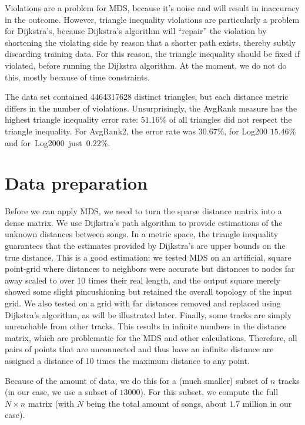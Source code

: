 \documentclass[10pt,fleqn,a4paper]{article}
\begin{document}
\begin{twocolumn}
Violations are a problem for MDS, because it's noise and will result in inaccuracy in the outcome. However, triangle inequality violations are particularly a problem for Dijkstra's, because Dijkstra's algorithm will ``repair'' the violation by shortening the violating side by reason that a shorter path exists, thereby subtly discarding training data. For this reason, the triangle inequality should be fixed if violated, before running the Dijkstra algorithm. At the moment, we do not do this, mostly because of time constraints.

The data set contained 4464317628 distinct triangles, but each distance metric differs in the number of violations.  Unsurprisingly, the AvgRank measure has the highest triangle inequality error rate: $51.16\%$ of all triangles did not respect the triangle inequality.  For AvgRank2, the error rate was $30.67\%$, for Log200 $15.46\%$ and for~Log2000~just~$0.22\%$.

\section{Data preparation}
Before we can apply MDS, we need to turn the sparse distance matrix into a dense matrix. We use Dijkstra's path algorithm to provide estimations of the unknown distances between songs.  In a metric space, the triangle inequality guarantees that the estimates provided by Dijkstra's are upper bounds on the true distance.  This is a good estimation: we tested MDS on an artificial, square point-grid where distances to neighbors were accurate but distances to nodes far away scaled to over 10 times their real length, and the output square merely showed some slight pincushioning but retained the overall topology of the input grid.  We also tested on a grid with far distances removed and replaced using Dijkstra's algorithm, as will be illustrated later.  Finally, some tracks are simply unreachable from other tracks.  This results in infinite numbers in the distance matrix, which are problematic for the MDS and other calculations.  Therefore, all pairs of points that are unconnected and thus have an infinite distance are assigned a distance of 10 times the maximum distance to any point.

Because of the amount of data, we do this for a (much smaller) subset of $n$ tracks (in our case, we use a subset of $13000$). For this subset, we compute the full $N \times n$ matrix (with $N$ being the total amount of songs, about $1.7$ million in our case).


\end{twocolumn}
\end{document}
